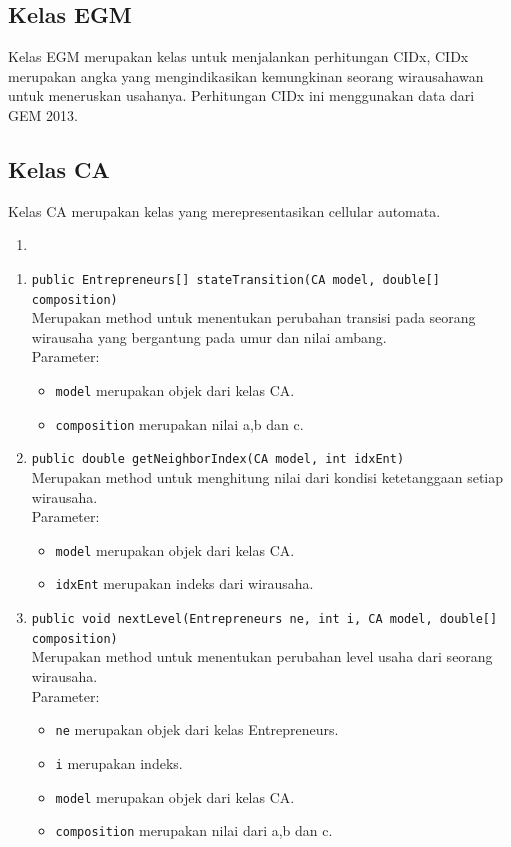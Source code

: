 \subsection{Kelas EGM}
	Kelas EGM merupakan kelas untuk menjalankan perhitungan CIDx, CIDx merupakan angka yang mengindikasikan kemungkinan seorang wirausahawan untuk meneruskan usahanya. Perhitungan CIDx ini menggunakan data dari GEM 2013.
	
\subsection{Kelas CA} 
Kelas CA merupakan kelas yang merepresentasikan cellular automata.
		\begin{enumerate}
			\item 
		\end{enumerate}
		\begin{enumerate}
			\item \texttt{public Entrepreneurs[] stateTransition(CA model, double[] composition)}\\
			Merupakan method untuk menentukan perubahan transisi pada seorang wirausaha yang bergantung pada umur dan nilai ambang.\\			Parameter:
			\begin{itemize}
				\item \texttt{model} merupakan objek dari kelas CA.
				\item \texttt{composition} merupakan nilai a,b dan c.
			\end{itemize}
			
			\item \texttt{public double getNeighborIndex(CA model, int idxEnt)}\\
			Merupakan method untuk menghitung nilai dari kondisi ketetanggaan setiap wirausaha.\\
			Parameter:
			\begin{itemize}
				\item \texttt{model} merupakan objek dari kelas CA.
				\item \texttt{idxEnt} merupakan indeks dari wirausaha.
			\end{itemize}
		
			\item \texttt{public void nextLevel(Entrepreneurs ne, int i, CA model, double[] composition)}\\
			Merupakan method untuk menentukan perubahan level usaha dari seorang wirausaha.\\
			Parameter:
			\begin{itemize}
				\item \texttt{ne} merupakan objek dari kelas Entrepreneurs.
				\item \texttt{i} merupakan indeks.
				\item \texttt{model} merupakan objek dari kelas CA.
				\item \texttt{composition} merupakan nilai dari a,b dan c.
			\end{itemize}
			

\end{enumerate}
